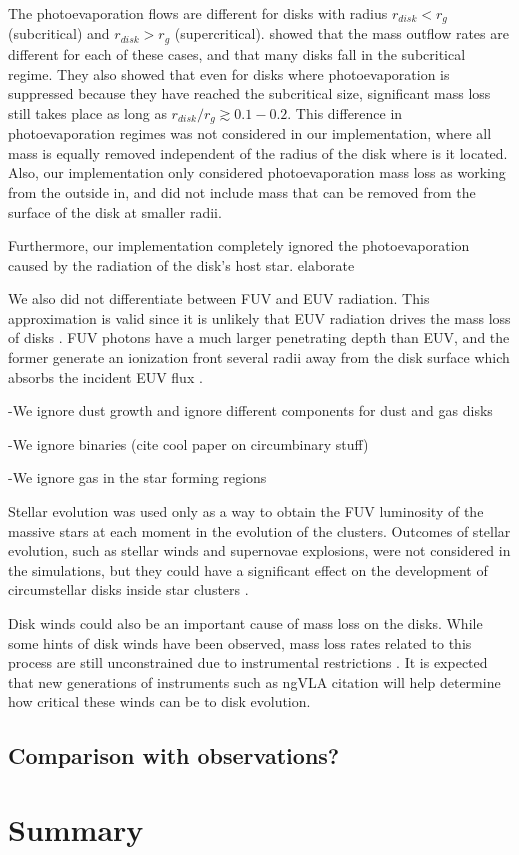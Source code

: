 \documentclass[fleqn,usenatbib]{mnras}
\newcommand\note[1]{{\colorbox{yellow!60}{\color{magenta}#1}}}
\begin{document}
The photoevaporation flows are different for disks with radius $r_{disk} < r_g$ (subcritical) and $r_{disk} > r_g$ (supercritical). \citet{adams2004} showed that the mass outflow rates are different for each of these cases, and that many disks fall in the subcritical regime. They also showed that even for disks where photoevaporation is suppressed because they have reached the subcritical size, significant mass loss still takes place as long as $r_{disk}/r_g \gtrsim 0.1-0.2$. This difference in photoevaporation regimes was not considered in our implementation, where all mass is equally removed independent of the radius of the disk where is it located. Also, our implementation only considered photoevaporation mass loss as working from the outside in, and did not include mass that can be removed from the surface of the disk at smaller radii. 

Furthermore, our implementation completely ignored the photoevaporation caused by the radiation of the disk's host star. \note{elaborate} \citep{fatuzzo2008}

We also did not differentiate between FUV and EUV radiation. This approximation is valid since it is unlikely that EUV radiation drives the mass loss of disks \citep{owen2012}. FUV photons have a much larger penetrating depth than EUV, and the former generate an ionization front several radii away from the disk surface which absorbs the incident EUV flux \citep{adams2004}. 

-We ignore dust growth and ignore different components for dust and gas disks 

-We ignore binaries (cite cool paper on circumbinary stuff)

-We ignore gas in the star forming regions

Stellar evolution was used only as a way to obtain the FUV luminosity of the massive stars at each moment in the evolution of the clusters. Outcomes of stellar evolution, such as stellar winds and supernovae explosions, were not considered in the simulations, but they could have a significant effect on the development of circumstellar disks inside star clusters \citep{close2017,portegieszwart2018,pelupessy2012}.

Disk winds could also be an important cause of mass loss on the disks. While some hints of disk winds have been observed, mass loss rates related to this process are still unconstrained due to instrumental restrictions \citep{pascucci2018}. It is expected that new generations of instruments such as ngVLA \note{citation} will help determine how critical these winds can be to disk evolution.

\subsection{Comparison with observations?}

\section{Summary}
\label{sec:summary}


\bsp	%


\label{lastpage}
\end{document}
